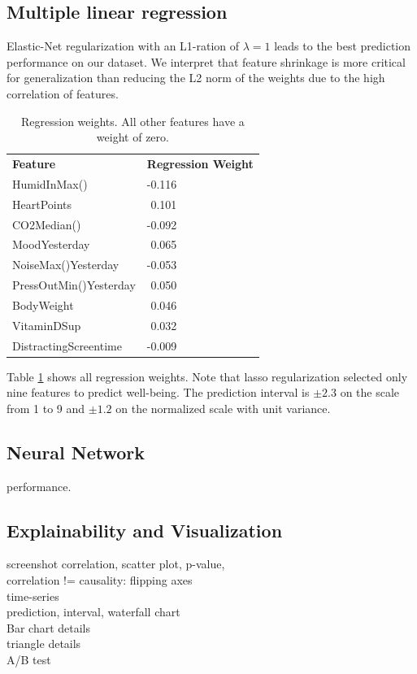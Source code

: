 \documentclass[conference]{IEEEtran}
\begin{document}
\subsection{Multiple linear regression}
Elastic-Net regularization with an L1-ration of $\lambda=1$ leads to the best prediction performance on our dataset. We interpret that feature shrinkage is more critical for generalization than reducing the L2 norm of the weights due to the high correlation of features.

\begin{table}[]
\caption[]{Regression weights. All other features have a weight of zero.}
\begin{tabular}{ll}
\textbf{Feature}       & \textbf{Regression Weight} \\
HumidInMax()           & -0.116                     \\
HeartPoints            & \,\,0.101                      \\
CO2Median()            & -0.092                     \\
MoodYesterday          & \,\,0.065                      \\
NoiseMax()Yesterday    & -0.053                     \\
PressOutMin()Yesterday & \,\,0.050                      \\
BodyWeight             & \,\,0.046                      \\
VitaminDSup            & \,\,0.032                      \\
DistractingScreentime  & -0.009                    
\end{tabular}
\label{tab:reg}
\end{table}

Table \ref{tab:reg} shows all regression weights. Note that lasso regularization selected only nine features to predict well-being. 
The prediction interval is $\pm2.3$ on the scale from 1 to 9 and $\pm1.2$ on the normalized scale with unit variance. 
\color{red}

\subsection{Neural Network}
performance.


\subsection{Explainability and Visualization}
screenshot correlation, scatter plot, p-value, \\
correlation != causality: flipping axes\\
time-series\\
prediction, interval, waterfall chart \\
Bar chart details\\
triangle details\\
A/B test\\
\end{document}
